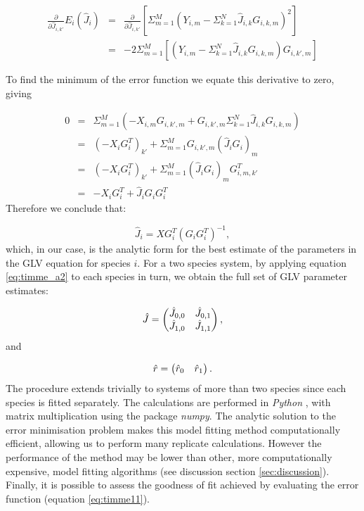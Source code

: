 \begin{eqnarray}
\frac{\partial}{\partial \hat{J}_{i,k'}} E_i(\hat{J}_i) &=& \frac{\partial}{\partial \hat{J}_{i,k'}} [\Sigma_{m=1}^{M}(Y_{i,m} - \Sigma_{k=1}^{N}\hat{J}_{i,k}G_{i,k,m})^2] \nonumber \\
    &=& -2\Sigma_{m=1}^{M}[(Y_{i,m} - \Sigma_{k=1}^{N}\hat{J}_{i,k}G_{i,k,m})G_{i,k',m}] \nonumber
\end{eqnarray}

To find the minimum of the error function we equate this derivative to zero, giving

\begin{eqnarray}
0 &=& \Sigma_{m=1}^{M}(-X_{i,m}G_{i,k',m} + G_{i,k',m}\Sigma_{k=1}^{N}\hat{J}_{i,k}G_{i,k,m}) \nonumber \\
  &=& (-X_iG_i^T)_{k'} + \Sigma_{m=1}^{M}G_{i,k',m}(\hat{J}_iG_i)_m   \nonumber \\
  &=& (-X_iG_i^T)_{k'} + \Sigma_{m=1}^{M}(\hat{J}_iG_i)_mG_{i,m,k'}^T  \nonumber \\
   &=& -X_iG_i^T + \hat{J}_iG_iG_i^T 
\end{eqnarray}
%
Therefore we conclude that:

\begin{equation}\label{eq:timme_a2}
\hat{J}_i = XG^T_i(G_iG^T_i)^{-1},
\end{equation}
%
which, in our case, is the analytic form for the best estimate of the parameters in the GLV equation for species $i$. For a two species system, by applying equation \ref{eq:timme_a2} to each species in turn, we obtain the full set of GLV parameter estimates: 

\begin{equation}\label{eq:timme_estimates}
\hat{J} =
\begin{pmatrix}
 \hat{J}_{0,0} & \hat{J}_{0,1} \\
 \hat{J}_{1,0} & \hat{J}_{1,1}
 \end{pmatrix}\\,
\end{equation}
%
and

\begin{equation}\label{eq:timme_estimates2}
\hat{r} =
\begin{pmatrix}
 \hat{r}_{0} & \hat{r}_{1} 
 \end{pmatrix}\\.
\end{equation}
%
The procedure extends trivially to systems of more than two species since each species is fitted separately. The calculations are performed in \emph{Python} \cite{python}, with matrix multiplication using the package \emph{numpy}. The analytic solution to the error minimisation problem makes this model fitting method computationally efficient, allowing us to perform many replicate calculations. However the performance of the method may be lower than other, more computationally expensive, model fitting algorithms (see discussion section \ref{sec:discussion}). Finally, it is possible to assess the goodness of fit achieved by evaluating the error function (equation \ref{eq:timme11}). 


